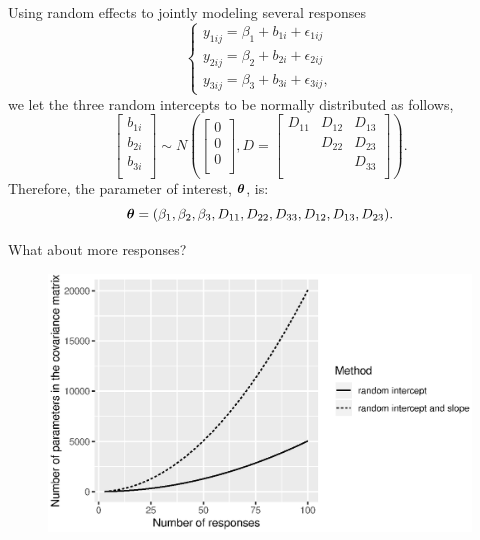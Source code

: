 \documentclass{beamer}
\newcommand{\bftheta}{\mbox{\boldmath $\theta$}}
\begin{document}
\begin{frame}{Using random effects to jointly modeling several responses}
\begin{equation*}
\begin{cases}
y_{1ij} = \beta_1 + b_{1i} + \epsilon_{1ij} \\
y_{2ij} = \beta_2 + b_{2i} + \epsilon_{2ij} \\
y_{3ij} = \beta_3 + b_{3i} + \epsilon_{3ij},
\end{cases}
\end{equation*}
we let the three random intercepts to be normally distributed as follows,
\begin{equation*}
\label{eq_SV_D}
\begin{bmatrix}
b_{1i} \\
b_{2i}\\
b_{3i}\\
\end{bmatrix} \sim N \left ( 
\begin{bmatrix}
0 \\
0\\
0\\
\end{bmatrix}, 
D=\begin{bmatrix}
D_{11} & D_{12} & D_{13}\\
 & D_{22} & D_{23}\\
&& D_{33}\\
\end{bmatrix}
\right).
\end{equation*}
Therefore, the parameter of interest, $\bftheta$, is:
\begin{equation*}
\bftheta= (\beta_1,\beta_2,\beta_3, D_{11},D_{22},D_{33},D_{12}, D_{13}, D_{23}).
\end{equation*}
\end{frame}

\begin{frame}{What about more responses?}
\begin{figure}
\centering
\includegraphics[width=\textwidth]{strucVert.eps}
\end{figure} 


\end{frame}
\end{document}
